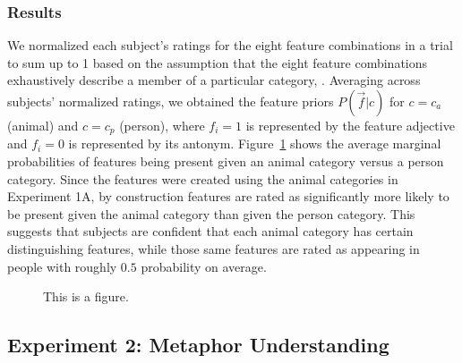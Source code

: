 \documentclass[10pt,letterpaper]{article}
\begin{document}
\subsubsection{Results} 
We normalized each subject's ratings for the eight feature combinations in a trial to sum up to 1 based on the assumption that the eight feature combinations exhaustively describe a member of a particular category, . Averaging across subjects' normalized ratings, we obtained the feature priors $P(\vec f | c)$ for $c = c_a$ (animal) and $c = c_p$ (person), where $f_i = 1$ is represented by the feature adjective and $f_i = 0$ is represented by its antonym. Figure~\ref{prior} shows the average marginal probabilities of features being present given an animal category versus a person category. Since the features were created using the animal categories in Experiment 1A, by construction features are rated as significantly more likely to be present given the animal category than given the person category. This suggests that subjects are confident that each animal category has certain distinguishing features, while those same features are rated as appearing in people with roughly $0.5$ probability on average.
\begin{figure}[t]
\begin{center}
\end{center}
\caption{This is a figure.} 
\label{prior}
\end{figure}


\subsection{Experiment 2: Metaphor Understanding}
\end{document}

